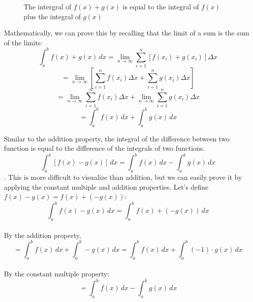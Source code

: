 \begin{figure}[htbp]
    \centering
    \caption{The intergral of $f(x) + g(x)$ is equal to the integral 
    of $f(x)$ plus the integral of $g(x)$}
    \label{fig:intsum}
\end{figure}

Mathematically, we can prove this by recalling that the limit of a 
sum is the sum of the limits: $$\int_a^b f(x) + g(x)\,dx = 
\lim_{n \to \infty} \sum_{i=1}^n [f(x_i)+g(x_i)]\Delta x$$ 
$$=\lim_{n \to \infty} [\sum_{i=1}^n f(x_i)\Delta x + \sum_{i = 1}^n 
g(x_i) \Delta x]$$ $$= \lim_{n \to \infty}\sum_{i=1}^n f(x_i)\Delta 
x + \lim_{n \to \infty} \sum_{i = 1}^n g(x_i) \Delta x$$ $$ = 
\int_a^b f(x)\,dx + \int_a^b g(x)\,dx$$

Similar to the addition property, the integral of the difference 
between two function is equal to the difference of the integrals of 
two functions. $$\int_a^b [f(x) - g(x)]\,dx = \int_a^b f(x)\,dx - 
\int_a^b g(x)\,dx$$. This is more difficult to visualize than addition, 
but we can easily prove it by applying the constant multiple and 
addition properties. Let's define $f(x) - g(x) = f(x) + (-g(x))$: 
$$\int_a^b f(x) - g(x)\,dx = \int_a^b f(x) + (-g(x))\,dx$$\\
By the addition property, $$=\int_a^b f(x)\,dx + \int_a^b -g(x)\,dx = 
\int_a^b f(x)\,dx + \int_a^b (-1)\cdot g(x)\,dx$$\\
By the constant multiple property: $$=\int_a^b f(x)\,dx - \int_a^b 
g(x)\,dx$$

